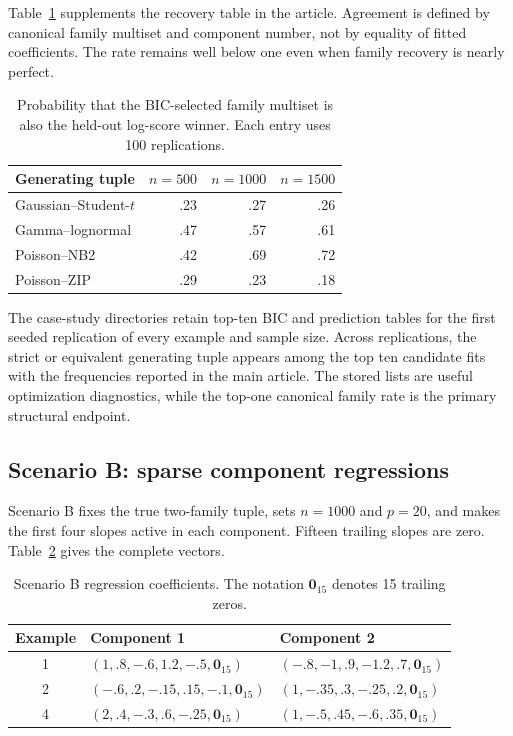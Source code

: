 \documentclass[a4paper,fleqn]{cas-sc}
\numberwithin{equation}{section}
\begin{document}
Table~\ref{supp:tab:criterion-agreement} supplements the recovery table in the article. Agreement is defined by canonical family multiset and component number, not by equality of fitted coefficients. The rate remains well below one even when family recovery is nearly perfect.

\begin{table}[t]
\centering
\caption{Probability that the BIC-selected family multiset is also the held-out log-score winner. Each entry uses 100 replications.}
\label{supp:tab:criterion-agreement}
\small
\begin{tabular}{lrrr}
\toprule
Generating tuple & $n=500$ & $n=1000$ & $n=1500$\\
\midrule
Gaussian--Student-$t$ & .23 & .27 & .26\\
Gamma--lognormal & .47 & .57 & .61\\
Poisson--NB2 & .42 & .69 & .72\\
Poisson--ZIP & .29 & .23 & .18\\
\bottomrule
\end{tabular}
\end{table}

The case-study directories retain top-ten BIC and prediction tables for the first seeded replication of every example and sample size. Across replications, the strict or equivalent generating tuple appears among the top ten candidate fits with the frequencies reported in the main article. The stored lists are useful optimization diagnostics, while the top-one canonical family rate is the primary structural endpoint.

\subsection{Scenario B: sparse component regressions}

Scenario B fixes the true two-family tuple, sets $n=1000$ and $p=20$, and makes the first four slopes active in each component. Fifteen trailing slopes are zero. Table~\ref{supp:tab:sparse-beta} gives the complete vectors.

\begin{table}[t]
\centering
\caption{Scenario B regression coefficients. The notation $\mathbf 0_{15}$ denotes 15 trailing zeros.}
\label{supp:tab:sparse-beta}
\small
\begin{tabular}{cll}
\toprule
Example & Component 1 & Component 2\\
\midrule
1 & $(1,.8,-.6,1.2,-.5,\mathbf0_{15})$ &
$(-.8,-1,.9,-1.2,.7,\mathbf0_{15})$\\
2 & $(-.6,.2,-.15,.15,-.1,\mathbf0_{15})$ &
$(1,-.35,.3,-.25,.2,\mathbf0_{15})$\\
4 & $(2,.4,-.3,.6,-.25,\mathbf0_{15})$ &
$(1,-.5,.45,-.6,.35,\mathbf0_{15})$\\
\bottomrule
\end{tabular}
\end{table}
\end{document}
